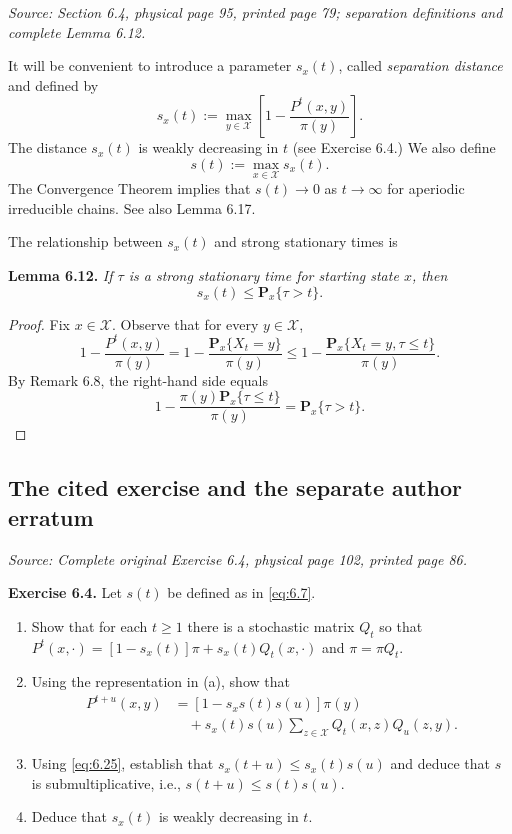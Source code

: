 \documentclass[11pt]{article}
\newcommand{\X}{\mathcal{X}}
\newcommand{\Px}{\mathbf{P}_x}
\newcommand{\sourceloc}[1]{\par\smallskip\noindent\textit{Source: #1.}\par\nopagebreak[4]\smallskip}
\begin{document}
\sourceloc{Section 6.4, physical page 95, printed page 79; separation definitions and complete Lemma 6.12}
It will be convenient to introduce a parameter $s_x(t)$, called
\emph{separation distance} and defined by
\begin{equation}
s_x(t):=\max_{y\in\X}\left[1-\frac{P^t(x,y)}{\pi(y)}\right].
\tag{6.6}\label{eq:6.6}
\end{equation}
The distance $s_x(t)$ is weakly decreasing in $t$ (see Exercise 6.4.)
We also define
\begin{equation}
s(t):=\max_{x\in\X}s_x(t).
\tag{6.7}\label{eq:6.7}
\end{equation}
The Convergence Theorem implies that $s(t)\to0$ as $t\to\infty$ for
aperiodic irreducible chains. See also Lemma 6.17.

The relationship between $s_x(t)$ and strong stationary times is

\noindent\textbf{Lemma 6.12.} \emph{If $\tau$ is a strong stationary time
for starting state $x$, then}
\begin{equation}
s_x(t)\le\Px\{\tau>t\}.
\tag{6.8}\label{eq:6.8}
\end{equation}
\begin{proof}
Fix $x\in\X$. Observe that for every $y\in\X$,
\begin{equation}
1-\frac{P^t(x,y)}{\pi(y)}
 =1-\frac{\Px\{X_t=y\}}{\pi(y)}
 \le1-\frac{\Px\{X_t=y,\tau\le t\}}{\pi(y)}.
\tag{6.9}\label{eq:6.9}
\end{equation}
By Remark 6.8, the right-hand side equals
\begin{equation}
1-\frac{\pi(y)\Px\{\tau\le t\}}{\pi(y)}=\Px\{\tau>t\}.
\tag{6.10}\label{eq:6.10}
\end{equation}
\end{proof}

\subsection*{The cited exercise and the separate author erratum}
\sourceloc{Complete original Exercise 6.4, physical page 102, printed page 86}
\noindent\textbf{Exercise 6.4.} Let $s(t)$ be defined as in \eqref{eq:6.7}.
\begin{enumerate}
\renewcommand{\labelenumi}{(\alph{enumi})}
\item Show that for each $t\ge1$ there is a stochastic matrix $Q_t$ so that
$P^t(x,\cdot)=[1-s_x(t)]\pi+s_x(t)Q_t(x,\cdot)$ and $\pi=\pi Q_t$.
\item Using the representation in (a), show that
\begin{equation}
\begin{aligned}
P^{t+u}(x,y)
 &=[1-s_x s(t)s(u)]\pi(y)\\
 &\quad+s_x(t)s(u)\sum_{z\in\X}Q_t(x,z)Q_u(z,y).
\end{aligned}
\tag{6.25}\label{eq:6.25}
\end{equation}
\item Using \eqref{eq:6.25}, establish that $s_x(t+u)\le s_x(t)s(u)$ and
deduce that $s$ is submultiplicative, i.e., $s(t+u)\le s(t)s(u)$.
\item Deduce that $s_x(t)$ is weakly decreasing in $t$.
\end{enumerate}
\end{document}
